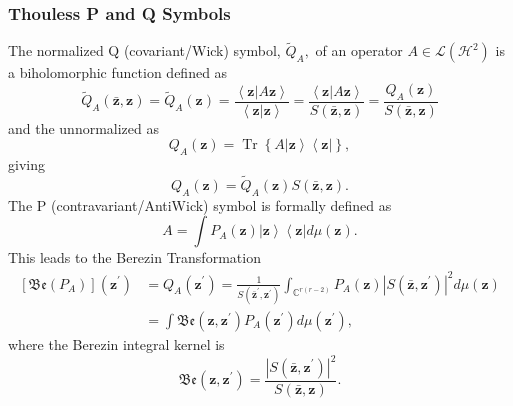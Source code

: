 \documentclass[aps,preprint]{revtex4}%
\begin{document}
\subsubsection{Thouless P and Q Symbols}

The normalized Q (covariant/Wick) symbol, $\tilde{Q}_{A},$ of an operator
$A\in\mathcal{L}\left(  \mathcal{H}^{2}\right)  $ is a biholomorphic function
defined as
\begin{equation}
\tilde{Q}_{A}\left(  \mathbf{\bar{z}},\mathbf{z}\right)  =\tilde{Q}_{A}\left(
\mathbf{z}\right)  =\frac{\left\langle \mathbf{z}\left\vert A\mathbf{z}%
\right.  \right\rangle }{\left\langle \mathbf{z}\left\vert \mathbf{z}\right.
\right\rangle }=\frac{\left\langle \mathbf{z}\left\vert A\mathbf{z}\right.
\right\rangle }{S\left(  \mathbf{\bar{z},z}\right)  }=\frac{Q_{A}\left(
\mathbf{z}\right)  }{S\left(  \mathbf{\bar{z},z}\right)  }%
\end{equation}
and the unnormalized as
\begin{equation}
Q_{A}\left(  \mathbf{z}\right)  =\operatorname*{Tr}\left\{  A\left\vert
\mathbf{z}\right\rangle \left\langle \mathbf{z}\right\vert \right\}  ,
\end{equation}
giving
\begin{equation}
Q_{A}\left(  \mathbf{z}\right)  =\tilde{Q}_{A}\left(  \mathbf{z}\right)
S\left(  \mathbf{\bar{z},z}\right)  .
\end{equation}
The P (contravariant/AntiWick) symbol is formally defined as
\begin{equation}
A=\int P_{A}\left(  \mathbf{z}\right)  \left\vert \mathbf{z}\right\rangle
\left\langle \mathbf{z}\right\vert d\mu\left(  \mathbf{z}\right)  .
\end{equation}
This leads to the Berezin Transformation
\begin{align}
\left[  \mathfrak{Be}\left(  P_{A}\right)  \right]  \left(  \mathbf{z}%
^{\prime}\right)   &  =Q_{A}\left(  \mathbf{z}^{\prime}\right)  =\frac
{1}{S\left(  \mathbf{\bar{z}}^{\prime}\mathbf{,z}^{\prime}\right)  }%
\int_{\mathbb{C}^{r\left(  r-2\right)  }}P_{A}\left(  \mathbf{z}\right)
\left\vert S\left(  \mathbf{\bar{z},z}^{\prime}\right)  \right\vert ^{2}%
d\mu\left(  \mathbf{z}\right) \nonumber\\
&  =\int\mathfrak{Be}\left(  \mathbf{z,z}^{\prime}\right)  P_{A}\left(
\mathbf{z}^{\prime}\right)  d\mu\left(  \mathbf{z}^{\prime}\right)  ,
\end{align}
where the Berezin integral kernel is
\begin{equation}
\mathfrak{Be}\left(  \mathbf{z,z}^{\prime}\right)  =\frac{\left\vert S\left(
\mathbf{\bar{z},z}^{\prime}\right)  \right\vert ^{2}}{S\left(  \mathbf{\bar
{z},z}\right)  }.
\end{equation}
\end{document}
